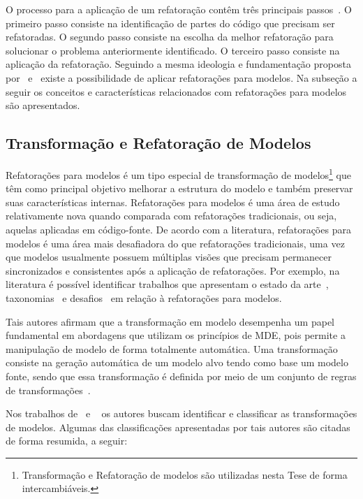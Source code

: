 O processo para a aplicação de um refatoração contêm três principais passos~\cite{Wake_2003}. O primeiro passo consiste na identificação de partes do código que precisam ser refatoradas. O segundo passo consiste na escolha da melhor refatoração para solucionar o problema anteriormente identificado. O terceiro passo consiste na aplicação da refatoração. Seguindo a mesma ideologia e fundamentação proposta por~ e~ existe a possibilidade de aplicar refatorações para modelos. Na subseção a seguir os conceitos e características relacionados com refatorações para modelos são apresentados.


\subsection{Transformação e Refatoração de Modelos}\label{sec:transformacoes_de_modelos}

Refatorações para modelos é um tipo especial de transformação de modelos\footnote{Transformação e Refatoração de modelos são utilizadas nesta Tese de forma intercambiáveis.} que têm como principal objetivo melhorar a estrutura do modelo e também preservar suas características internas. Refatorações para modelos é uma área de estudo relativamente nova quando comparada com refatorações tradicionais, ou seja, aquelas aplicadas em código-fonte. De acordo com a literatura, refatorações para modelos é uma área mais desafiadora do que refatorações tradicionais, uma vez que modelos usualmente possuem múltiplas visões que precisam permanecer sincronizados e consistentes após a aplicação de refatorações. Por exemplo, na literatura é possível identificar trabalhos que apresentam o estado da arte~\cite{Tom_2008_2008}, taxonomias~\cite{Maddeh_2010} e desafios~\cite{mens_03_refactoring, Mens07RefacTools, Van_Der_Straeten_2009, mens2003refactoring_novo_rafa} em relação à refatorações para modelos. 

Tais autores afirmam que a transformação em modelo desempenha um papel fundamental em abordagens que utilizam os princípios de MDE, pois permite a manipulação de modelo de forma totalmente automática. Uma transformação consiste na geração automática de um modelo alvo tendo como base um modelo fonte, sendo que essa transformação é definida por meio de um conjunto de regras de transformações~\cite{Mens_2006}. 

Nos trabalhos de~ e ~ os autores buscam identificar e classificar as transformações de modelos. Algumas das classificações apresentadas por tais autores são citadas de forma resumida, a seguir:

